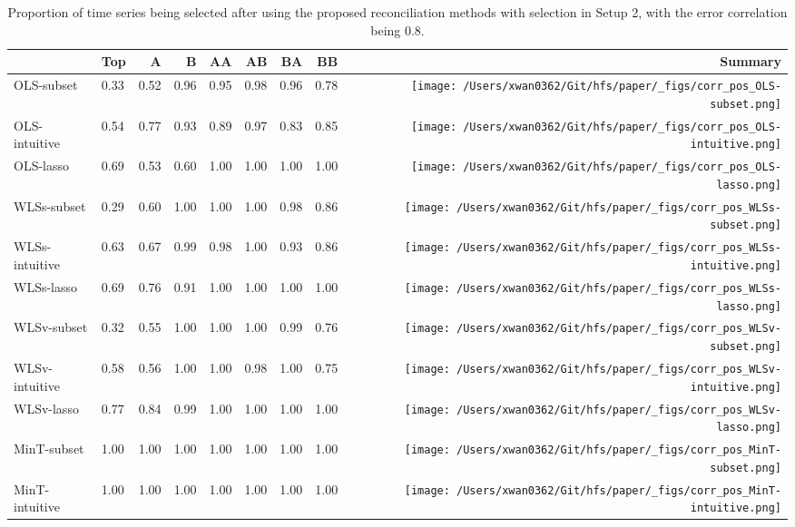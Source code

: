 \documentclass[
  11pt]{article}
\begin{document}
\hypertarget{tbl-corr-selection-pos}{}
\begin{table}
\caption{\label{tbl-corr-selection-pos}Proportion of time series being selected after using the proposed
reconciliation methods with selection in Setup 2, with the error
correlation being 0.8. }\tabularnewline

\centering\begingroup\fontsize{11}{13}\selectfont

\begin{threeparttable}
\begin{tabular}{llrrrrrr>{}r}
\toprule
  & Top & A & B & AA & AB & BA & BB & Summary\\
\midrule
OLS-subset & 0.33 & 0.52 & 0.96 & 0.95 & 0.98 & 0.96 & 0.78 & \texttt{[image: /Users/xwan0362/Git/hfs/paper/\_figs/corr\_pos\_OLS-subset.png]}\\
OLS-intuitive & 0.54 & 0.77 & 0.93 & 0.89 & 0.97 & 0.83 & 0.85 & \texttt{[image: /Users/xwan0362/Git/hfs/paper/\_figs/corr\_pos\_OLS-intuitive.png]}\\
OLS-lasso & 0.69 & 0.53 & 0.60 & 1.00 & 1.00 & 1.00 & 1.00 & \texttt{[image: /Users/xwan0362/Git/hfs/paper/\_figs/corr\_pos\_OLS-lasso.png]}\\
\midrule
WLSs-subset & 0.29 & 0.60 & 1.00 & 1.00 & 1.00 & 0.98 & 0.86 & \texttt{[image: /Users/xwan0362/Git/hfs/paper/\_figs/corr\_pos\_WLSs-subset.png]}\\
WLSs-intuitive & 0.63 & 0.67 & 0.99 & 0.98 & 1.00 & 0.93 & 0.86 & \texttt{[image: /Users/xwan0362/Git/hfs/paper/\_figs/corr\_pos\_WLSs-intuitive.png]}\\
WLSs-lasso & 0.69 & 0.76 & 0.91 & 1.00 & 1.00 & 1.00 & 1.00 & \texttt{[image: /Users/xwan0362/Git/hfs/paper/\_figs/corr\_pos\_WLSs-lasso.png]}\\
\midrule
WLSv-subset & 0.32 & 0.55 & 1.00 & 1.00 & 1.00 & 0.99 & 0.76 & \texttt{[image: /Users/xwan0362/Git/hfs/paper/\_figs/corr\_pos\_WLSv-subset.png]}\\
WLSv-intuitive & 0.58 & 0.56 & 1.00 & 1.00 & 0.98 & 1.00 & 0.75 & \texttt{[image: /Users/xwan0362/Git/hfs/paper/\_figs/corr\_pos\_WLSv-intuitive.png]}\\
WLSv-lasso & 0.77 & 0.84 & 0.99 & 1.00 & 1.00 & 1.00 & 1.00 & \texttt{[image: /Users/xwan0362/Git/hfs/paper/\_figs/corr\_pos\_WLSv-lasso.png]}\\
\midrule
MinT-subset & 1.00 & 1.00 & 1.00 & 1.00 & 1.00 & 1.00 & 1.00 & \texttt{[image: /Users/xwan0362/Git/hfs/paper/\_figs/corr\_pos\_MinT-subset.png]}\\
MinT-intuitive & 1.00 & 1.00 & 1.00 & 1.00 & 1.00 & 1.00 & 1.00 & \texttt{[image: /Users/xwan0362/Git/hfs/paper/\_figs/corr\_pos\_MinT-intuitive.png]}\\

\end{tabular}
\end{threeparttable}
\end{table}
\end{document}
